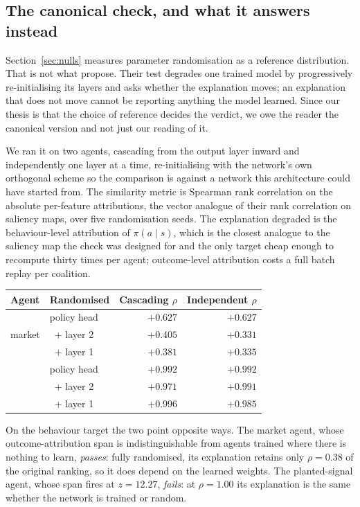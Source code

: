 \documentclass[10pt,twocolumn]{article}
\begin{document}
\subsection{The canonical check, and what it answers instead}
\label{sec:canonical}

Section~\ref{sec:nulls} measures parameter randomisation as a reference
distribution. That is not what \citet{adebayo2018sanity} propose. Their test
degrades one trained model by progressively re-initialising its layers and asks
whether the explanation moves; an explanation that does not move cannot be
reporting anything the model learned. Since our thesis is that the choice of
reference decides the verdict, we owe the reader the canonical version and not
just our reading of it.

We ran it on two agents, cascading from the output layer inward and
independently one layer at a time, re-initialising with the network's own
orthogonal scheme so the comparison is against a network this architecture could
have started from. The similarity metric is Spearman rank correlation on the
absolute per-feature attributions, the vector analogue of their rank correlation
on saliency maps, over five randomisation seeds. The explanation degraded is the
behaviour-level attribution of $\pi(a \mid s)$, which is the closest analogue to
the saliency map the check was designed for and the only target cheap enough to
recompute thirty times per agent; outcome-level attribution costs a full batch
replay per coalition.

\begin{center}\footnotesize
\begin{tabular}{llrr}
\toprule
Agent & Randomised & Cascading $\rho$ & Independent $\rho$ \\
\midrule
\multirow{3}{*}{market}
  & policy head & $+0.627$ & $+0.627$ \\
  & \, + layer 2 & $+0.405$ & $+0.331$ \\
  & \, + layer 1 & $\mathbf{+0.381}$ & $+0.335$ \\
\addlinespace
\multirow{3}{*}{planted}
  & policy head & $+0.992$ & $+0.992$ \\
  & \, + layer 2 & $+0.971$ & $+0.991$ \\
  & \, + layer 1 & $\mathbf{+0.996}$ & $+0.985$ \\
\bottomrule
\end{tabular}
\end{center}

On the behaviour target the two point opposite ways. The market agent, whose
outcome-attribution span is indistinguishable from agents trained where there is
nothing to learn, \emph{passes}: fully randomised, its explanation retains only
$\rho=0.38$ of the original ranking, so it does depend on the learned weights.
The planted-signal agent, whose span fires at $z=12.27$, \emph{fails}: at
$\rho=1.00$ its explanation is the same whether the network is trained or random.
\end{document}
